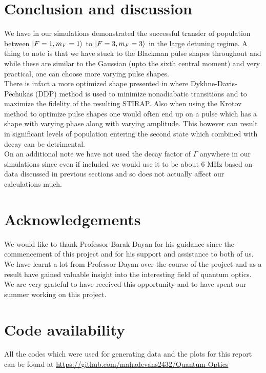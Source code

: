 \documentclass[%
 reprint,
 amsmath,amssymb,
 aps,
]{revtex4-2}
\begin{document}
\section{Conclusion and discussion}
We have in our simulations demonstrated the successful transfer of population between $\ket{F=1,m_F=1}$ to $\ket{F=3,m_F=3}$ in the large detuning regime. A thing to note is that we have stuck to the Blackman pulse shapes throughout and while these are similar to the Gaussian (upto the sixth central moment) and very practical, one can choose more varying pulse shapes.\\
There is infact a more optimized shape presented in \cite{PhysRevA.80.013417} where Dykhne-Davis-Pechukas (DDP) method is used to minimize nonadiabatic transitions and to maximize the fidelity of the resulting STIRAP. Also when using the Krotov method to optimize pulse shapes one would often end up on a pulse which has a shape with varying phase along with varying amplitude. This however can result in significant levels of population entering the second state which combined with decay can be detrimental.\\
On an additional note we have not used the decay factor of $\Gamma$ anywhere in our simulations since even if included we would use it to be about $6$ MHz based on data discussed in previous sections and so does not actually affect our calculations much.

\section*{Acknowledgements}
We would like to thank Professor Barak Dayan for his guidance since the commencement of this project and for his support and assistance to both of us. We have learnt a lot from Professor Dayan over the course of the project and as a result have gained valuable insight into the interesting field of quantum optics. We are very grateful to have received this opportunity and to have spent our summer working on this project.

\section*{Code availability}
All the codes which were used for generating data and the plots for this report can be found at \url{https://github.com/mahadevans2432/Quantum-Optics}


\end{document}
